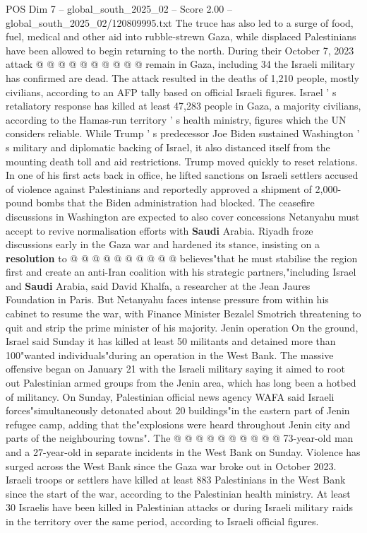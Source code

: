 \begin{textsample}{POS Dim 7 – global\_south\_2025\_02 – Score 2.00 – global\_south\_2025\_02/120809995.txt}
The truce has also led to a surge of food, fuel, medical and other aid into rubble-strewn Gaza, while displaced Palestinians have been allowed to begin returning to the north.
During their October 7, 2023 attack @ @ @ @ @ @ @ @ @ @ remain in Gaza, including 34 the Israeli military has confirmed are dead.
The attack resulted in the deaths of 1,210 people, mostly civilians, according to an AFP tally based on official Israeli figures.
Israel ' s retaliatory response has killed at least 47,283 people in Gaza, a majority civilians, according to the Hamas-run territory ' s health ministry, figures which the UN considers reliable.
While Trump ' s predecessor Joe Biden sustained Washington ' s military and diplomatic backing of Israel, it also distanced itself from the mounting death toll and aid restrictions.
Trump moved quickly to reset relations.
In one of his first acts back in office, he lifted sanctions on Israeli settlers accused of violence against Palestinians and reportedly approved a shipment of 2,000-pound bombs that the Biden administration had blocked.
The ceasefire discussions in Washington are expected to also cover concessions Netanyahu must accept to revive normalisation efforts with \textbf{Saudi} Arabia.
Riyadh froze discussions early in the Gaza war and hardened its stance, insisting on a \textbf{resolution} to @ @ @ @ @ @ @ @ @ @ believes"that he must stabilise the region first and create an anti-Iran coalition with his strategic partners,"including Israel and \textbf{Saudi} Arabia, said David Khalfa, a researcher at the Jean Jaures Foundation in Paris.
But Netanyahu faces intense pressure from within his cabinet to resume the war, with Finance Minister Bezalel Smotrich threatening to quit and strip the prime minister of his majority.
Jenin operation On the ground, Israel said Sunday it has killed at least 50 militants and detained more than 100"wanted individuals"during an operation in the West Bank.
The massive offensive began on January 21 with the Israeli military saying it aimed to root out Palestinian armed groups from the Jenin area, which has long been a hotbed of militancy.
On Sunday, Palestinian official news agency WAFA said Israeli forces"simultaneously detonated about 20 buildings"in the eastern part of Jenin refugee camp, adding that the"explosions were heard throughout Jenin city and parts of the neighbouring towns".
The @ @ @ @ @ @ @ @ @ @ 73-year-old man and a 27-year-old in separate incidents in the West Bank on Sunday.
Violence has surged across the West Bank since the Gaza war broke out in October 2023.
Israeli troops or settlers have killed at least 883 Palestinians in the West Bank since the start of the war, according to the Palestinian health ministry.
At least 30 Israelis have been killed in Palestinian attacks or during Israeli military raids in the territory over the same period, according to Israeli official figures.

\end{textsample}
